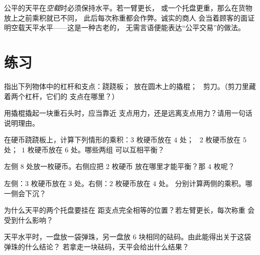 \begin{remark}[检查空载的天平]\label{rem:g3:levers-and-scales:fair}
公平的天平在\emph{空载}时必须保持水平。若一臂更长，
或一个托盘更重，那么在货物放上之前乘积就已不同，
此后每次称重都会作弊。诚实的商人
会当着顾客的面证明空载天平水平——这是一种古老的，
无需言语便能表达“公平交易”的做法。
\end{remark}

\section{练习}

\begin{exercise}[$\star$]\label{exo:g3:levers-and-scales:1}
指出下列物体中的杠杆和支点：跷跷板；\ 放在圆木上的撬棍；
\ 剪刀。（剪刀里藏着两个杠杆，它们的
支点在哪里？）
\end{exercise}

\begin{exercise}[$\star$]\label{exo:g3:levers-and-scales:2}
用撬棍撬起一块重石头时，应当靠近
支点用力，还是远离支点用力？请用一句话说明理由。
\end{exercise}

\begin{exercise}[$\star$]\label{exo:g3:levers-and-scales:3}
在硬币跷跷板上，计算下列情形的乘积：$3$ 枚硬币放在 $4$ 处；
\ $2$ 枚硬币放在 $5$ 处；\ $1$ 枚硬币放在 $6$ 处。哪些两组
可以互相平衡？
\end{exercise}

\begin{exercise}[$\star$]\label{exo:g3:levers-and-scales:4}
左侧 $8$ 处放一枚硬币。右侧应把 $2$ 枚硬币
放在哪里才能平衡？那 $4$ 枚呢？
\end{exercise}

\begin{exercise}[$\star$]\label{exo:g3:levers-and-scales:5}
左侧：$3$ 枚硬币放在 $3$ 处。右侧：$2$ 枚硬币放在 $4$ 处。
分别计算两侧的乘积。哪一侧会下沉？
\end{exercise}

\begin{exercise}[$\star$]\label{exo:g3:levers-and-scales:6}
为什么天平的两个托盘要挂在
距支点完全相等的位置？若左臂更长，每次称重
会受到什么影响？
\end{exercise}

\begin{exercise}[$\star$]\label{exo:g3:levers-and-scales:7}
天平水平时，一盘放一袋弹珠，另一盘放 $6$
块相同的砝码。由此能得出关于这袋弹珠的什么结论？
若拿走一块砝码，天平会给出什么结果？
\end{exercise}

